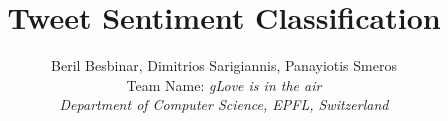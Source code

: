 \documentclass[9pt,conference,compsocconf]{IEEEtran}
\begin{document}
\title{Tweet Sentiment Classification}

\author{Beril Besbinar, Dimitrios Sarigiannis, Panayiotis Smeros\\
Team Name: \textit{gLove is in the air}\\
\textit{Department of Computer Science, EPFL, Switzerland}}

\maketitle


















\cleardoublepage


\end{document}
